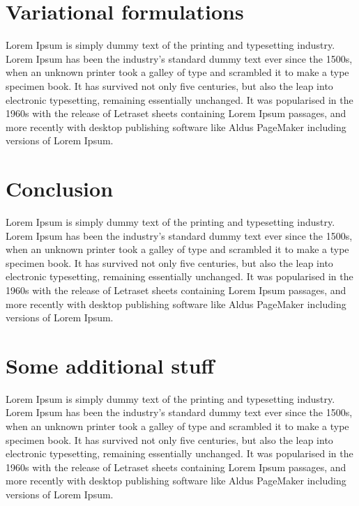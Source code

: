 \documentclass[10pt,a4paper, oneside]{article}
\theoremstyle{remark}
\begin{document}
	\section{Variational formulations}
	\label{sec:formulation}

	Lorem Ipsum is simply dummy text of the printing and typesetting industry. Lorem Ipsum has been the industry's standard dummy text ever since the 1500s, when an unknown printer took a galley of type and scrambled it to make a type specimen book. It has survived not only five centuries, but also the leap into electronic typesetting, remaining essentially unchanged. It was popularised in the 1960s with the release of Letraset sheets containing Lorem Ipsum passages, and more recently with desktop publishing software like Aldus PageMaker including versions of Lorem Ipsum.
	\section{Conclusion}
	\label{sec:conclusion}

	Lorem Ipsum is simply dummy text of the printing and typesetting industry. Lorem Ipsum has been the industry's standard dummy text ever since the 1500s, when an unknown printer took a galley of type and scrambled it to make a type specimen book. It has survived not only five centuries, but also the leap into electronic typesetting, remaining essentially unchanged. It was popularised in the 1960s with the release of Letraset sheets containing Lorem Ipsum passages, and more recently with desktop publishing software like Aldus PageMaker including versions of Lorem Ipsum.
	\appendix
	\section{Some additional stuff}\label{sec:appenix_a}

	Lorem Ipsum is simply dummy text of the printing and typesetting industry. Lorem Ipsum has been the industry's standard dummy text ever since the 1500s, when an unknown printer took a galley of type and scrambled it to make a type specimen book. It has survived not only five centuries, but also the leap into electronic typesetting, remaining essentially unchanged. It was popularised in the 1960s with the release of Letraset sheets containing Lorem Ipsum passages, and more recently with desktop publishing software like Aldus PageMaker including versions of Lorem Ipsum.
    
\end{document}
